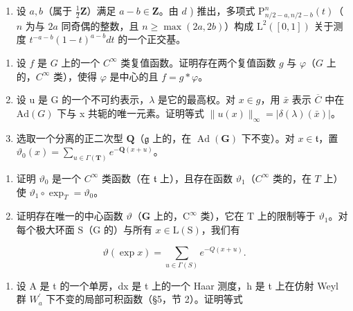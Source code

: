 \begin{enumerate}
\begin{enumerate}
\def\labelenumi{\alph{enumi})}
\setcounter{enumi}{4}
\tightlist
\item
  设 \(a, b\)（属于 \(\frac{1}{2}\mathbf{Z}\)）满足 \(a - b \in \mathbf{Z}\)。由 \(d\) ) 推出，多项式 \(\mathrm{P}_{n/2 - a, n/2 - b}^n(t)\)（\(n\) 为与 \(2a\) 同奇偶的整数，且 \(n \geq \max(2a, 2b)\)）构成 \(\mathrm{L}^2([0,1])\) 关于测度 \(t^{-a - b}(1 - t)^{a - b}dt\) 的一个正交基。
\end{enumerate}

\begin{enumerate}
\def\labelenumi{\arabic{enumi})}
\setcounter{enumi}{1}
\item
  设 \(f\) 是 \(G\) 上的一个 \(C^\infty\) 类复值函数。证明存在两个复值函数 \(g\) 与 \(\varphi\)（\(G\) 上的，\(C^\infty\) 类），使得 \(\varphi\) 是中心的且 \(f = g * \varphi\)。
\item
  设 u 是 G 的一个不可约表示，\(\lambda\) 是它的最高权。对 \(x \in g\)，用 \(\bar{x}\) 表示 \(\overline{C}\) 中在 \(\mathrm{Ad}(G)\) 下与 x 共轭的唯一元素。证明等式 \(\|u(x)\|_{\infty} = |\delta(\lambda)(\bar{x})|\)。
\item
  选取一个分离的正二次型 \(\mathbf{Q}\)（\(\mathfrak{g}\) 上的，在 \(\operatorname{Ad}(\mathbf{G})\) 下不变）。对 \(x \in \mathfrak{t}\)，置 \(\vartheta_0(x) = \sum_{u \in \Gamma(\mathbf{T})} e^{-\mathbf{Q}(x + u)}\)。
\end{enumerate}

\begin{enumerate}
\def\labelenumi{\alph{enumi})}
\item
  证明 \(\vartheta_0\) 是一个 \(C^\infty\) 类函数（在 \(\mathfrak{t}\) 上），且存在函数 \(\vartheta_1\)（\(C^\infty\) 类的，在 \(T\) 上）使 \(\vartheta_1 \circ \exp_T = \vartheta_0\)。
\item
  证明存在唯一的中心函数 \(\vartheta\)（\(\mathbf{G}\) 上的，\(\mathrm{C}^{\infty}\) 类），它在 \(\mathrm{T}\) 上的限制等于 \(\vartheta_{1}\)。对每个极大环面 \(\mathrm{S}\)（\(\mathrm{G}\) 的）与所有 \(x\in \mathrm{L}(\mathrm{S})\)，我们有
\end{enumerate}

\[
\vartheta (\exp x) = \sum_ {u \in \Gamma (S)} e ^ {- Q (x + u)}.
\]

\begin{enumerate}
\def\labelenumi{\alph{enumi})}
\setcounter{enumi}{2}
\tightlist
\item
  设 A 是 t 的一个单房，dx 是 t 上的一个 Haar 测度，h 是 t 上在仿射 Weyl 群 \(W_{a}^{\prime}\) 下不变的局部可积函数（§5，节 2）。证明等式
\end{enumerate}


\end{enumerate}
